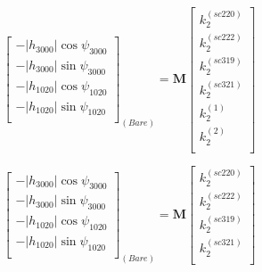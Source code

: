 \begin{equation}
    \begin{bmatrix}
        -|h_{3000}| \cos \psi_{3000} \\
        -|h_{3000}| \sin \psi_{3000} \\
        -|h_{1020}| \cos \psi_{1020} \\
        -|h_{1020}| \sin \psi_{1020} \\
        \end{bmatrix}_{(Bare)}
         =
        \boldsymbol{M}
        \begin{bmatrix}
        k_2^{(sc220)} \\
        k_2^{(sc222)}\\
        k_2^{(sc319)} \\
        k_2^{(sc321)}\\
        k_2^{(1)} \\
        k_2^{(2)}\\
        \end{bmatrix}
\end{equation}

\begin{equation}
    \begin{bmatrix}
        -|h_{3000}| \cos \psi_{3000} \\
        -|h_{3000}| \sin \psi_{3000} \\
        -|h_{1020}| \cos \psi_{1020} \\
        -|h_{1020}| \sin \psi_{1020} \\
        \end{bmatrix}_{(Bare)}
         =
        \boldsymbol{M}
        \begin{bmatrix}
        k_2^{(sc220)} \\
        k_2^{(sc222)}\\
        k_2^{(sc319)} \\
        k_2^{(sc321)}\\
        \end{bmatrix}        
\end{equation}

